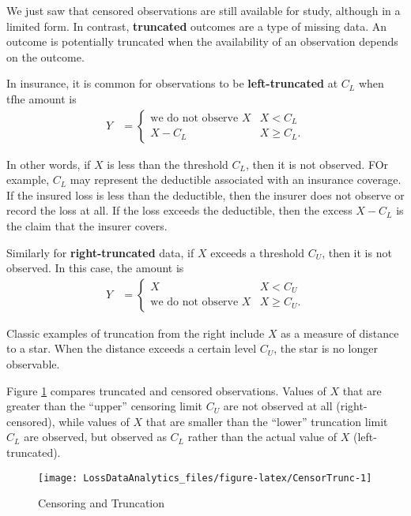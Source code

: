 \documentclass[]{book}
\theoremstyle{definition}
\theoremstyle{definition}
\theoremstyle{definition}
\theoremstyle{remark}
\begin{document}
We just saw that censored observations are still available for study,
although in a limited form. In contrast, \textbf{truncated} outcomes are
a type of missing data. An outcome is potentially truncated when the
availability of an observation depends on the outcome.

In insurance, it is common for observations to be
\textbf{left-truncated} at \(C_L\) when tfhe amount is \[\begin{aligned}
Y &=
\left\{
\begin{array}{ll}
\text{we do not observe }X & X < C_L \\
X- C_L & X \geq C_L.
\end{array}
\right.\end{aligned}\]

In other words, if \(X\) is less than the threshold \(C_L\), then it is
not observed. FOr example, \(C_L\) may represent the deductible
associated with an insurance coverage. If the insured loss is less than
the deductible, then the insurer does not observe or record the loss at
all. If the loss exceeds the deductible, then the excess \(X-C_L\) is
the claim that the insurer covers.

Similarly for \textbf{right-truncated} data, if \(X\) exceeds a
threshold \(C_U\), then it is not observed. In this case, the amount is
\[\begin{aligned}
Y &=
\left\{
\begin{array}{ll}
X & X < C_U \\
\text{we do not observe }X & X \geq C_U.
\end{array}
\right.\end{aligned}\]

Classic examples of truncation from the right include \(X\) as a measure
of distance to a star. When the distance exceeds a certain level
\(C_U\), the star is no longer observable.

Figure \ref{fig:CensorTrunc} compares truncated and censored
observations. Values of \(X\) that are greater than the ``upper''
censoring limit \(C_U\) are not observed at all (right-censored), while
values of \(X\) that are smaller than the ``lower'' truncation limit
\(C_L\) are observed, but observed as \(C_L\) rather than the actual
value of \(X\) (left-truncated).

\begin{figure}

{\centering \texttt{[image: LossDataAnalytics\_files/figure-latex/CensorTrunc-1]} 

}

\caption{Censoring and Truncation}\label{fig:CensorTrunc}
\end{figure}
\end{document}
